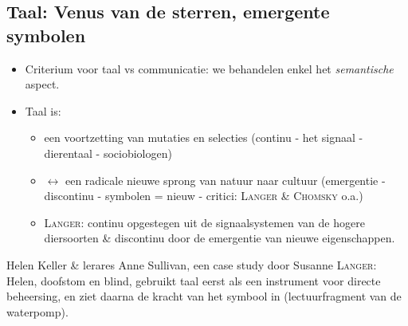 \documentclass[11pt,a4paper]{article}
\begin{document}
\subsection{Taal: Venus van de sterren, emergente symbolen}
 \begin{itemize}
 \item Criterium voor taal vs communicatie: we behandelen enkel het \emph{semantische} aspect.
 \item Taal is: 
 \begin{itemize}
 \item een voortzetting van mutaties en selecties (continu - het signaal - dierentaal - sociobiologen)
 \item $\leftrightarrow$ een radicale nieuwe sprong van natuur naar cultuur (emergentie - discontinu - symbolen = nieuw - critici: \textsc{Langer \& Chomsky} o.a.)
 \item \textsc{Langer}: continu opgestegen uit de signaalsystemen van de hogere diersoorten \& discontinu door de emergentie van nieuwe eigenschappen.
 \end{itemize}
 \end{itemize}
 
Helen Keller \& lerares Anne Sullivan, een case study door Susanne \textsc{Langer}:
Helen, doofstom en blind, gebruikt taal eerst als een instrument voor directe beheersing, en ziet daarna de kracht van het symbool in (lectuurfragment van de waterpomp).
\end{document}
